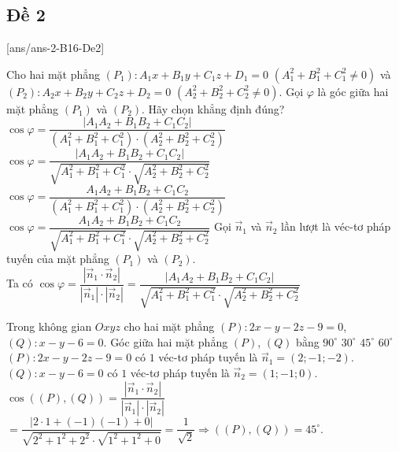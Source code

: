 \subsection{Đề 2}
[ans/ans-2-B16-De2]
\caulc
\begin{ex}%
	Cho hai mặt phẳng $(P_1)\colon A_1x+B_1y+C_1z+D_1=0$ $(A_1^2+B_1^2+C_1^2\ne 0)$ và \break $(P_2) \colon A_2x+B_2y+C_2z+D_2=0$ $(A_2^2+B_2^2+C_2^2\ne 0)$. Gọi $\varphi$ là góc giữa hai mặt phẳng $(P_1)$ và $(P_2)$. Hãy chọn khẳng định đúng?
	\choice
	{$\cos \varphi =\dfrac{\left|A_1A_2+B_1B_2+C_1C_2\right|}{(A_1^2+B_1^2+C_1^2)\cdot (A_2^2+B_2^2+C_2^2)}$}
	{\True $\cos \varphi =\dfrac{\left|A_1A_2+B_1B_2+C_1C_2\right|}{\sqrt{A_1^2+B_1^2+C_1^2}\cdot \sqrt{A_2^2+B_2^2+C_2^2}}$}
	{$\cos \varphi =\dfrac{A_1A_2+B_1B_2+C_1C_2}{(A_1^2+B_1^2+C_1^2)\cdot(A_2^2+B_2^2+C_2^2)}$}
	{$\cos \varphi =\dfrac{A_1A_2+B_1B_2+C_1C_2}{\sqrt{A_1^2+B_1^2+C_1^2}\cdot\sqrt{A_2^2+B_2^2+C_2^2}}$}
	\loigiai
	{
		Gọi $\overrightarrow{n}_1$ và $\overrightarrow{n}_2$ lần lượt là véc-tơ pháp tuyến của mặt phẳng $(P_1)$ và $(P_2)$.\\
		Ta có $\cos \varphi = \dfrac{\left|\overrightarrow{n}_1\cdot \overrightarrow{n}_2\right|}{\left|\overrightarrow{n}_1\right|\cdot \left|\overrightarrow{n}_2\right|}=\dfrac{\left|A_1A_2+B_1B_2+C_1C_2\right|}{\sqrt{A_1^2+B_1^2+C_1^2}\cdot\sqrt{A_2^2+B_2^2+C_2^2}}$
	}
\end{ex}
\begin{ex}%
	Trong không gian $Oxyz$ cho hai mặt phẳng $(P)\colon 2x - y-2z-9=0$,\break $(Q)\colon  x - y - 6=0$. Góc giữa hai mặt phẳng  $(P)$, $(Q)$ bằng
	\choice
	{$90^\circ$}
	{$30^\circ$}
	{\True $45^\circ$}
	{$60^\circ$}
	\loigiai
	{
		$(P)\colon 2x - y-2z-9=0$ có $1$ véc-tơ pháp tuyến là $\overrightarrow{n}_1 = (2;-1;-2)$.\\
		$(Q)\colon  x - y - 6=0$ có $1$ véc-tơ pháp tuyến là $\overrightarrow{n}_2 = (1;-1;0)$.\\
		$\cos \left(\left( P \right),\left( Q \right)\right) = \dfrac{\left|\overrightarrow{n}_1\cdot \overrightarrow{n}_2\right|}{\left|\overrightarrow{n}_1\right|\cdot \left|\overrightarrow{n}_2\right|} $
		$= \dfrac{\left|2\cdot 1 + \left(- 1\right)\left(- 1\right) + 0\right|}{\sqrt{2^2 + 1^2 + 2^2}\cdot \sqrt{1^2+ 1^2 + 0}}= \dfrac{1}{\sqrt{2}} \Rightarrow \left(\left( P \right),\left( Q \right)\right) = 45^\circ$.
	}
\end{ex}
